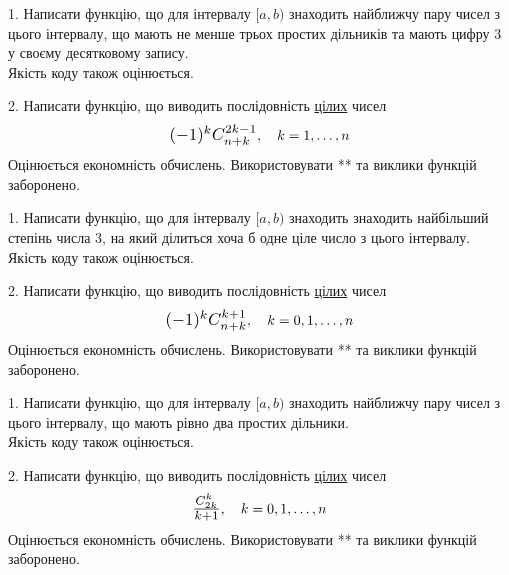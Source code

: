 \documentclass[12pt, ukrainian]{article}
\begin{document}
\begin {Large}
1. Написати функцію, що для інтервалу $[a, b)$ знаходить найближчу пару чисел з цього інтервалу, що мають не менше трьох простих дільників та мають цифру 3 у своєму десятковому запису.\\	Якість коду також оцінюється. 



\vspace{10mm}

\newpage

2. 
Написати функцію, що виводить послідовність \underline{цілих} чисел
$$\scalebox{1.2}{$(-1)^{k}C_{n+k}^{2k-1}$}, \quad k=1,\ldots,n$$
Оцінюється економність обчислень. Використовувати ** та виклики функцій заборонено.

\end {Large}\newpage




\begin {Large}
1. Написати функцію, що для інтервалу $[a, b)$ знаходить знаходить найбільший степінь числа 3, на який ділиться хоча б одне ціле число з цього інтервалу.\\	Якість коду також оцінюється. 



\vspace{10mm}

\newpage

2. 
Написати функцію, що виводить послідовність \underline{цілих} чисел
$$\scalebox{1.2}{$(-1)^{k}C_{n+k}^{k+1}$}, \quad k=0,1,\ldots,n$$
Оцінюється економність обчислень. Використовувати ** та виклики функцій заборонено.

\end {Large}\newpage




\begin {Large}
1. Написати функцію, що для інтервалу $[a, b)$ знаходить найближчу пару чисел з цього інтервалу, що мають рівно два простих дільники.\\	Якість коду також оцінюється. 



\vspace{10mm}

\newpage

2. 
Написати функцію, що виводить послідовність \underline{цілих} чисел
$$\scalebox{1.2}{$\frac{C_{2k}^k}{k+1}$}, \quad k=0,1,\ldots,n$$
Оцінюється економність обчислень. Використовувати ** та виклики функцій заборонено.

\end {Large}\newpage
\end{document}
